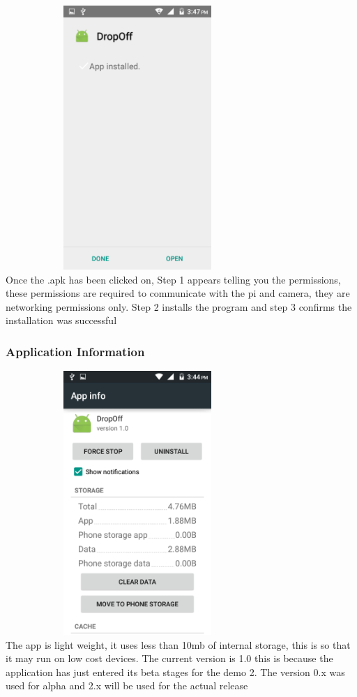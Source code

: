 \documentclass[a4paper,12pt]{article}
\begin{document}
			\includegraphics[width=10cm,height=10cm,keepaspectratio]{./Pictures/install3.png}\\
			Once the .apk has been clicked on, Step 1 appears telling you the permissions, these permissions are required to communicate with the pi and camera, they are networking permissions only. Step 2 installs the program and step 3 confirms the installation was successful\newline\newline
			
			\subsubsection{Application Information}
			\includegraphics[width=10cm,height=10cm,keepaspectratio]{./Pictures/appinfo.png}\\
			The app is light weight, it uses less than 10mb of internal storage, this is so that it may run on low cost devices. The current version is 1.0 this is because the application has just entered its beta stages for the demo 2. The version 0.x was used for alpha and 2.x will be used for the actual release
				
\end{document}
